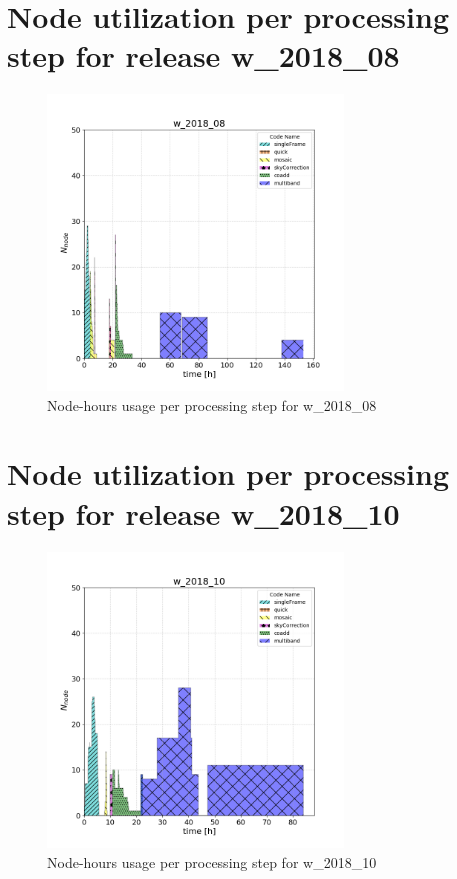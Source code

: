 \clearpage
\section{Node utilization per processing step for release w\_2018\_08}

\begin{figure}[h]
  \centering
  \includegraphics[width=0.70\textwidth]{figures/usage-w_2018_08-ultimate.png}
  \caption{Node-hours usage per processing step for w\_2018\_08}
  \label{fig:PerTask08}
\end{figure}


\clearpage
\section{Node utilization per processing step for release w\_2018\_10}

\begin{figure}[h]
  \centering
  \includegraphics[width=0.70\textwidth]{figures/usage-w_2018_10-ultimate.png}
  \caption{Node-hours usage per processing step for w\_2018\_10}
  \label{fig:PerTask10}
\end{figure}



